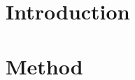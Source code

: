 \documentclass[12pt]{report}
\begin{document}
\chapter{Introduction}

\chapter{Method}

\printbibliography
\end{document}
